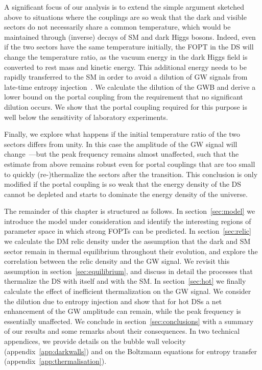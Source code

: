 A significant focus of our analysis is to extend the simple argument sketched above to situations where the couplings are so weak that the dark and visible sectors do not necessarily share a common temperature, which would be maintained through (inverse) decays of \ac{SM} and dark Higgs bosons. Indeed, even if the two sectors have the same temperature initially, the \ac{FOPT} in the \ac{DS} will change the temperature ratio, as the vacuum energy in the dark Higgs  field is converted to rest mass and kinetic energy. This additional energy needs to be rapidly transferred to the \ac{SM} in order to avoid a dilution of \ac{GW} signals from late-time entropy injection~\cite{Ertas:2021xeh,Bringmann:2023opz}. We calculate the dilution of the \ac{GWB} and derive a lower bound on the portal coupling from the requirement that no significant dilution occurs. We show that the portal coupling required for this purpose is well below the sensitivity of laboratory experiments.

Finally, we explore what happens if the initial temperature ratio of the two sectors differs from unity. In this case the amplitude of the \ac{GW} signal will change~\cite{Breitbach:2018ddu,Fairbairn:2019xog,Li:2023bxy}---but the peak frequency remains almost
unaffected, such that the estimate from above remains robust even for portal couplings that are too small to quickly (re-)thermalize the sectors after the transition. This conclusion is only modified if the portal coupling is so weak that the energy density of the \ac{DS} cannot be depleted and starts to dominate the energy density of the universe.

The remainder of this chapter is structured as follows. In section~\ref{sec:model} we introduce the model under consideration and identify the interesting regions of parameter space in which strong \acp{FOPT} can be predicted. In section~\ref{sec:relic} we calculate the \ac{DM} relic density under the assumption that the dark and \ac{SM} sector remain in thermal equilibrium throughout their evolution, and explore the correlation between the relic density and the \ac{GW} signal. We revisit this assumption in section~\ref{sec:equilibrium}, and discuss in detail the processes that thermalize the \ac{DS} with itself and with the \ac{SM}. In section~\ref{sec:hot} we finally calculate the effect of inefficient thermalization on the \ac{GW} signal. We consider the dilution due to  entropy injection and show that for hot \acp{DS} a net enhancement of the \ac{GW} amplitude can remain, while the peak frequency is essentially unaffected. We conclude in section~\ref{sec:conclusions} with a summary of our results and some remarks about their consequences. In two technical appendices, we provide details on the bubble wall velocity (appendix~\ref{app:darkwalls}) and on the Boltzmann equations for entropy transfer (appendix~\ref{app:thermalisation}).



